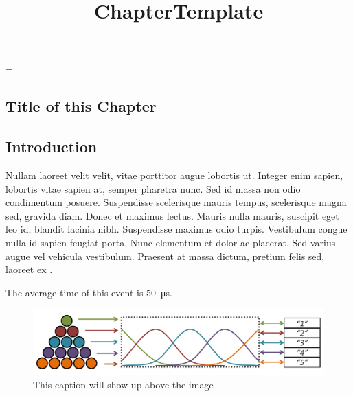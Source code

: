 \emergencystretch=\maxdimen
{}

\begin{refsection}

\title{ChapterTemplate}

\chapter{Title of this Chapter}
\AddLabels

\section{Introduction}

\noindent Nullam laoreet velit velit, vitae porttitor augue lobortis ut. Integer enim sapien, lobortis vitae sapien at, semper pharetra nunc. Sed id massa non odio condimentum posuere. Suspendisse scelerisque mauris tempus, scelerisque magna sed, gravida diam. Donec et maximus lectus. Mauris nulla mauris, suscipit eget leo id, blandit lacinia nibh. Suspendisse maximus odio turpis. Vestibulum congue nulla id sapien feugiat porta. Nunc elementum et dolor ac placerat. Sed varius augue vel vehicula vestibulum. Praesent at massa dictum, pretium felis sed, laoreet ex \parencite*{article_key}.


The average time of this event is \SI{50}{\micro\second}.

\FloatBarrier
\begin{figure}[!ht]
\caption{This caption will show up above the image}
\label{fig:NameOfFigure1}
\includegraphics[width=1\textwidth]{../ChapterTemplate/Images/ANS Mapping Account.pdf}
\end{figure}
\FloatBarrier


\end{refsection}
